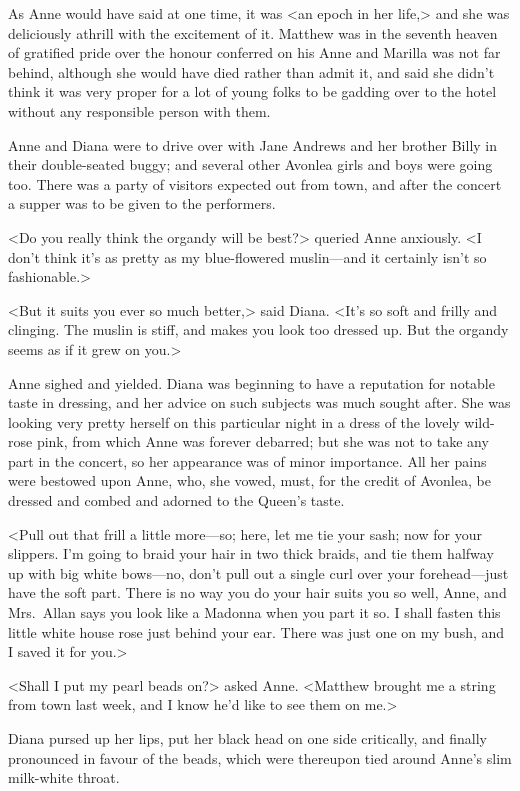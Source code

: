 As Anne would have said at one time, it was <an epoch in her life,> and she was deliciously athrill with the excitement of it. Matthew was in the seventh heaven of gratified pride over the honour conferred on his Anne and Marilla was not far behind, although she would have died rather than admit it, and said she didn't think it was very proper for a lot of young folks to be gadding over to the hotel without any responsible person with them.

Anne and Diana were to drive over with Jane Andrews and her brother Billy in their double-seated buggy; and several other Avonlea girls and boys were going too. There was a party of visitors expected out from town, and after the concert a supper was to be given to the performers.

<Do you really think the organdy will be best?> queried Anne anxiously. <I don't think it's as pretty as my blue-flowered muslin—and it certainly isn't so fashionable.>

<But it suits you ever so much better,> said Diana. <It's so soft and frilly and clinging. The muslin is stiff, and makes you look too dressed up. But the organdy seems as if it grew on you.>

Anne sighed and yielded. Diana was beginning to have a reputation for notable taste in dressing, and her advice on such subjects was much sought after. She was looking very pretty herself on this particular night in a dress of the lovely wild-rose pink, from which Anne was forever debarred; but she was not to take any part in the concert, so her appearance was of minor importance. All her pains were bestowed upon Anne, who, she vowed, must, for the credit of Avonlea, be dressed and combed and adorned to the Queen's taste.

<Pull out that frill a little more—so; here, let me tie your sash; now for your slippers. I'm going to braid your hair in two thick braids, and tie them halfway up with big white bows—no, don't pull out a single curl over your forehead—just have the soft part. There is no way you do your hair suits you so well, Anne, and Mrs.~Allan says you look like a Madonna when you part it so. I shall fasten this little white house rose just behind your ear. There was just one on my bush, and I saved it for you.>

<Shall I put my pearl beads on?> asked Anne. <Matthew brought me a string from town last week, and I know he'd like to see them on me.>

Diana pursed up her lips, put her black head on one side critically, and finally pronounced in favour of the beads, which were thereupon tied around Anne's slim milk-white throat.

